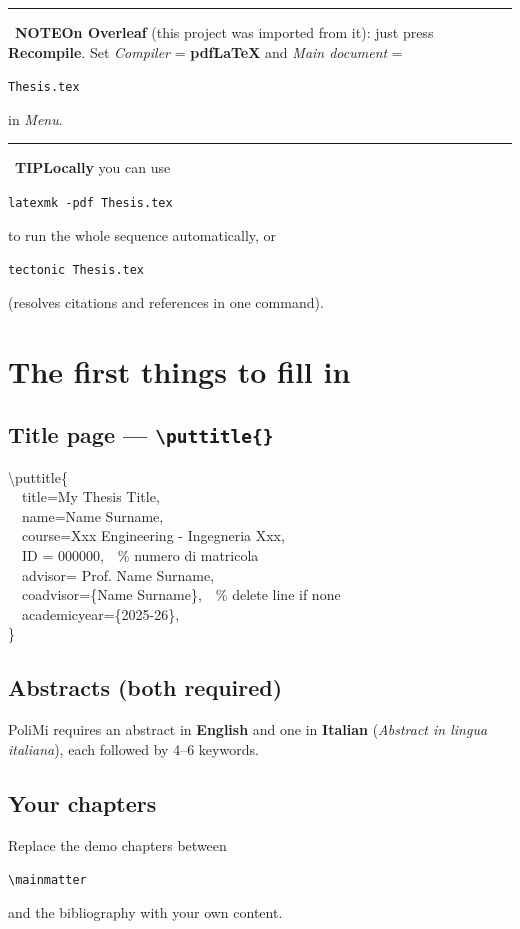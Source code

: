 \documentclass[11pt]{article}
\newcommand{\marker}[2]{\textcolor{#1}{\rule[0.05em]{0.7em}{0.7em}}~\textbf{\textcolor{#1}{#2}}}
\newcommand{\code}[1]{%
  \colorbox{codebg}{\rule[-0.2em]{0pt}{1em}\texttt{\small #1}}}
\begin{document}
\begin{note}
\marker{accent}{NOTE}\quad\textbf{On Overleaf} (this project was imported from it): just press
\textbf{Recompile}. Set \emph{Compiler} = \textbf{pdfLaTeX} and \emph{Main document}
= \code{Thesis.tex} in \emph{Menu}.
\end{note}

\begin{tip}
\marker{green!45!black}{TIP}\quad\textbf{Locally} you can use \code{latexmk -pdf Thesis.tex} to run the
whole sequence automatically, or \code{tectonic Thesis.tex} (resolves citations
and references in one command).
\end{tip}

\section{The first things to fill in}

\subsection{Title page --- \texttt{\textbackslash puttitle\{\}}}
\begin{cmd}
\textbackslash puttitle\{\\
\ \ title=My Thesis Title,\\
\ \ name=Name Surname,\\
\ \ course=Xxx Engineering - Ingegneria Xxx,\\
\ \ ID = 000000,\ \ \% numero di matricola\\
\ \ advisor= Prof. Name Surname,\\
\ \ coadvisor=\{Name Surname\},\ \ \% delete line if none\\
\ \ academicyear=\{2025-26\},\\
\}
\end{cmd}

\subsection{Abstracts (both required)}
PoliMi requires an abstract in \textbf{English} and one in \textbf{Italian}
(\emph{Abstract in lingua italiana}), each followed by 4--6 keywords.

\subsection{Your chapters}
Replace the demo chapters between \code{\textbackslash mainmatter} and the
bibliography with your own content.
\end{document}
